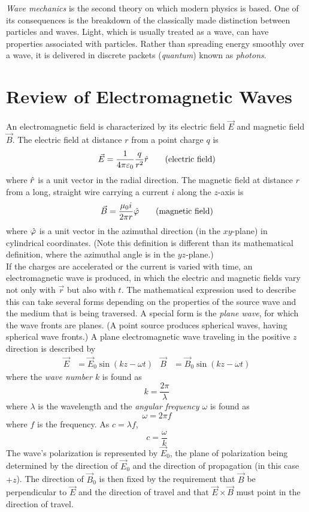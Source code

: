 \documentclass{subfiles}
\begin{document}
	\textit{Wave mechanics} is the second theory on which modern physics is based. One of its consequences is the breakdown of the classically made distinction between particles and waves. Light, which is usually treated as a wave, can have properties associated with particles. Rather than spreading energy smoothly over a wave, it is delivered in discrete packets (\textit{quantum}) known as \textit{photons}.\
		\section{Review of Electromagnetic Waves}
			An electromagnetic field is characterized by its electric field \(\vec{E}\) and magnetic field \(\vec{B}\). The electric field at distance \(r\) from a point charge \(q\) is
				\[\vec{E} = \frac{1}{4\pi\varepsilon_0}\frac{q}{r^2}\hat{r} \tag{electric field}\]
				where \(\hat{r}\) is a unit vector in the radial direction. The magnetic field at distance \(r\) from a long, straight wire carrying a current \(i\) along the \(z\)-axis is
				\[\vec{B} = \frac{\mu_0i}{2\pi r}\hat{\varphi} \tag{magnetic field}\]
				where \(\hat{\varphi}\) is a unit vector in the azimuthal direction (in the \(xy\)-plane) in cylindrical coordinates. (Note this definition is different than its mathematical definition, where the azimuthal angle is in the \(yz\)-plane.) \\
				If the charges are accelerated or the current is varied with time, an electromagnetic wave is produced, in which the electric and magnetic fields vary not only with \(\vec{r}\) but also with \(t\). The mathematical expression used to describe this can take several forms depending on the properties of the source wave and the medium that is being traversed. A special form is the \textit{plane wave}, for which the wave fronts are planes. (A point source produces spherical waves, having spherical wave fronts.) A plane electromagnetic wave traveling in the positive \(z\) direction is described by
				\begin{align*}
					\vec{E} &= \vec{E}_0\sin(kz - \omega t) &
						\vec{B} &= \vec{B}_0\sin(kz - \omega t)
							\tag{planar wave}	
				\end{align*}
				where the \textit{wave number \(k\)} is found as
				\[k = \frac{2\pi}{\lambda} \tag{wave number}\]
				where \(\lambda\) is the wavelength and the \textit{angular frequency \(\omega\)} is found as
				\[\omega = 2\pi f \tag{angular frequency}\]
				where \(f\) is the frequency. As \(c = \lambda f\),
				\[c = \frac{\omega}{k}\]
				The wave's polarization is represented by \(\vec{E}_0\), the plane of polarization being determined by the direction of \(\vec{E}_0\) and the direction of propagation (in this case \(+z\)). The direction of \(\vec{B}_0\) is then fixed by the requirement that \(\vec{B}\) be perpendicular to \(\vec{E}\) and the direction of travel and that \(\vec{E} \times \vec{B}\) must point in the direction of travel. \\
\end{document}

